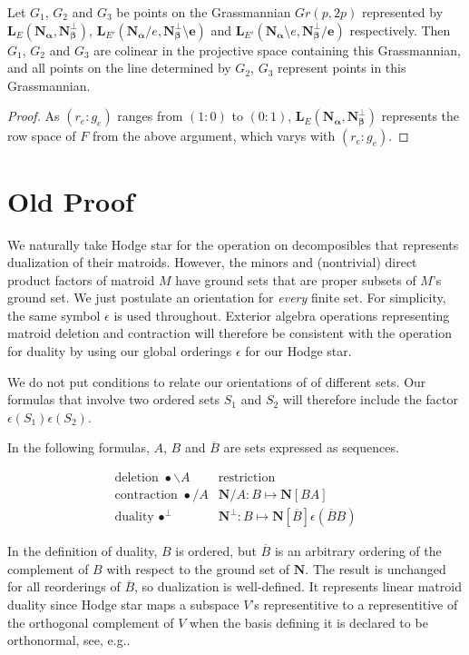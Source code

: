 \documentclass[Unicode]{cedram-alco}
\newcommand{\ext}[1]{\ensuremath{\mathbf{#1}}}
\begin{document}
\begin{prop}
Let $G_1$, $G_2$ and $G_3$ be points on the Grassmannian $Gr(p,2p)$ represented by
$\ext{L}_E(\ext{N_\alpha},\ext{N_\beta^\perp})$,
$\ext{L}_{E'}(\ext{N_\alpha}/e,\ext{N_\beta^\perp\setminus e})$ and
$\ext{L}_{E'}(\ext{N_\alpha}\setminus e,\ext{N_\beta^\perp/e})$ respectively. Then
$G_1$, $G_2$ and $G_3$ are colinear in the projective space containing this Grassmannian, and
all points on the line determined by $G_2$, $G_3$ represent points in this Grassmannian.
\end{prop}
\begin{proof}
  As $(r_e:g_e)$ ranges from $(1:0)$ to $(0:1)$, $\ext{L}_E(\ext{N_\alpha},\ext{N_\beta^\perp})$ represents
  the row space of $F$ from the above argument, which varys with $(r_e:g_e)$.
\end{proof}

\newpage

\section{Old Proof}

We naturally take Hodge star for the operation on
decomposibles that represents dualization of their
matroids.
However, the minors and
(nontrivial) direct product factors of matroid $M$
have ground sets that are proper subsets of $M$'s ground set.
We just postulate an orientation for \emph{every} finite set.
For simplicity, the same symbol $\epsilon$ is used throughout.
Exterior algebra operations
representing matroid deletion and contraction will therefore
be consistent with the operation for duality by using our
global orderings $\epsilon$ for our Hodge star.

We do not put conditions to relate our orientations of
of different sets.  Our formulas that involve two ordered sets $S_1$
and $S_2$ will therefore include the factor $\epsilon(S_1)\epsilon(S_2)$.




In the following formulas, $A$, $B$ and $\overline{B}$ are
sets expressed as sequences.
\begin{defi}\label{extmatdefs}
    \[
    \begin{array}{cc}
\text{deletion\ } \bullet\backslash A  & \text{restriction}  \\
\text{contraction\ }\bullet / A             & \ext{N}/A:B\mapsto\ext{N}[BA]\\
\text{duality\ }\bullet^{\perp} &
\ext{N}^{\perp}:B\mapsto\ext{N}[\overline{B}]\epsilon(\overline{B}B)
    \end{array}
    \]
\end{defi}
    In the definition of duality, $B$ is ordered,
    but $\overline{B}$ is an arbitrary ordering of the complement of $B$
    with respect to the ground set of $\ext{N}$.
    The result is unchanged for all reorderings of $\overline{B}$,
    so dualization is well-defined.  It represents linear matroid duality
    since Hodge star maps a subspace $V$'s representitive to a representitive
    of the orthogonal complement of $V$ when the basis defining it is
    declared to be orthonormal, see, e.g.\cite{MarcusFDMuAlPt2}.
\end{document}
